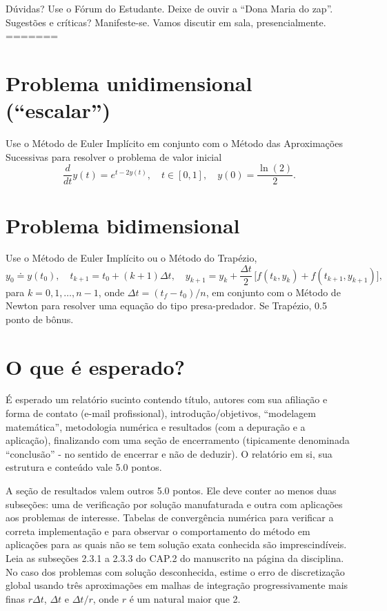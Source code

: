 \documentclass{article}
\begin{document}
\vspace{5mm}

\noindent
Dúvidas? Use o Fórum do Estudante. 
 Deixe de ouvir a ``Dona Maria do zap''. Sugestões e críticas? Manifeste-se. Vamos discutir em sala,  presencialmente. 
=======


\section{Problema unidimensional (``escalar'')}

Use o Método de Euler Implícito em conjunto com o Método das Aproximações Sucessivas para resolver o problema de valor inicial
\[\frac{d}{dt}{y}(t)=e^{t-2y(t)},\quad t\in [0,1],\quad y(0)=\frac{\ln(2)}{2}.\]

\section{Problema bidimensional}
Use o Método de Euler Implícito ou o Método do Trapézio, 
\[ y_0\doteq y(t_0),\quad t_{k+1}=t_0+(k+1)\Delta t,\quad y_{k+1}=y_k+\frac{\Delta t}{2}\,\Big[f(t_k,y_k)+f(t_{k+1},y_{k+1})\Big], 
\] 
para $k=0,1,\ldots , n-1$, onde $\Delta t=(t_f-t_0)/n$,
em conjunto com o Método de Newton para resolver uma equação do tipo presa-predador. Se Trapézio, 0.5 ponto de bônus.

\section{O que é esperado?}
É esperado um relatório sucinto contendo título, autores com sua afiliação e forma de contato (e-mail profissional), introdução/objetivos, ``modelagem mate\-mática'', metodologia numérica e resultados (com a depuração e a aplicação), finalizando com uma seção de encerramento (tipicamente denominada ``conclusão'' -  no sentido de encerrar e não de deduzir). O relatório em si, sua estrutura e conteúdo vale 5.0 pontos. 

A seção de resultados valem outros 5.0 pontos. Ele deve conter ao menos duas subseções: uma de verificação por solução manufaturada e outra com aplicações aos problemas de interesse. Tabelas de convergência numérica para verificar a correta implementação e para observar o comportamento do método em aplicações para as quais não se tem solução exata conhecida são imprescindíveis. Leia as subseções 2.3.1 a 2.3.3 do CAP.2 do manuscrito na página da disciplina. No caso dos problemas com solução desconhecida, estime o erro de discretização global usando três aproximações em malhas de integração progressivamente mais finas $r\Delta t$, $\Delta t$ e $\Delta t/r$, onde $r$ é um natural maior que 2.
\end{document}
